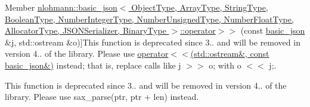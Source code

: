 \begin{DoxyRefList}
Member \hyperlink{classnlohmann_1_1basic__json_a34d6a60dd99e9f33b8273a1c8db5669b}{nlohmann\+:\+:basic\+\_\+json$<$ Object\+Type, Array\+Type, String\+Type, Boolean\+Type, Number\+Integer\+Type, Number\+Unsigned\+Type, Number\+Float\+Type, Allocator\+Type, J\+S\+O\+N\+Serializer, Binary\+Type $>$\+:\+:operator$>$$>$} (const \hyperlink{classnlohmann_1_1basic__json}{basic\+\_\+json} \&j, std\+::ostream \&o)]This function is deprecated since 3.. and will be removed in version 4.. of the library. Please use \hyperlink{classnlohmann_1_1basic__json_a5e34c5435e557d0bf666bd7311211405}{operator$<$$<$(std\+::ostream\&, const basic\+\_\+json\&)} instead; that is, replace calls like {\ttfamily j $>$$>$ o;} with {\ttfamily o $<$$<$ j;}.  
\item[\label{deprecated__deprecated000004}%
\Hypertarget{deprecated__deprecated000004}%
Member \hyperlink{classnlohmann_1_1basic__json_aef9ef0a817ecde8bf270653e8706c150}{nlohmann\+:\+:basic\+\_\+json$<$ Object\+Type, Array\+Type, String\+Type, Boolean\+Type, Number\+Integer\+Type, Number\+Unsigned\+Type, Number\+Float\+Type, Allocator\+Type, J\+S\+O\+N\+Serializer, Binary\+Type $>$\+:\+:sax\+\_\+parse} (\hyperlink{classnlohmann_1_1detail_1_1span__input__adapter}{detail\+::span\+\_\+input\+\_\+adapter} \&\&i, S\+AX $\ast$sax, input\+\_\+format\+\_\+t format=input\+\_\+format\+\_\+t\+::json, const bool strict=true, const bool ignore\+\_\+comments=false)]This function is deprecated since 3.. and will be removed in version 4.. of the library. Please use sax\+\_\+parse(ptr, ptr + len) instead. 
\end{DoxyRefList}